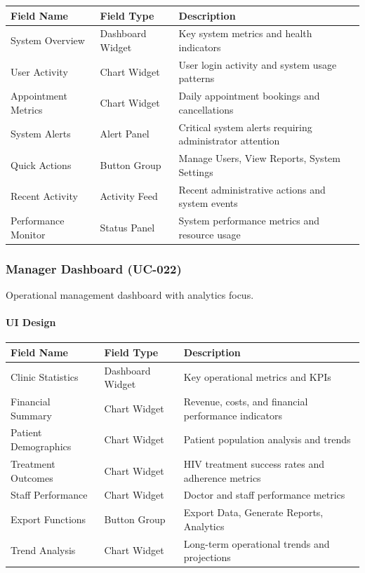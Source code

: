 \documentclass[12pt,a4paper]{article}
\begin{document}
\begin{longtable}{|p{3cm}|p{3cm}|p{8cm}|}
\hline
\textbf{Field Name} & \textbf{Field Type} & \textbf{Description} \\
\hline
System Overview & Dashboard Widget & Key system metrics and health indicators \\
\hline
User Activity & Chart Widget & User login activity and system usage patterns \\
\hline
Appointment Metrics & Chart Widget & Daily appointment bookings and cancellations \\
\hline
System Alerts & Alert Panel & Critical system alerts requiring administrator attention \\
\hline
Quick Actions & Button Group & Manage Users, View Reports, System Settings \\
\hline
Recent Activity & Activity Feed & Recent administrative actions and system events \\
\hline
Performance Monitor & Status Panel & System performance metrics and resource usage \\
\hline
\end{longtable}

\subsubsection{Manager Dashboard (UC-022)}

Operational management dashboard with analytics focus.

\paragraph{UI Design}

\begin{longtable}{|p{3cm}|p{3cm}|p{8cm}|}
\hline
\textbf{Field Name} & \textbf{Field Type} & \textbf{Description} \\
\hline
Clinic Statistics & Dashboard Widget & Key operational metrics and KPIs \\
\hline
Financial Summary & Chart Widget & Revenue, costs, and financial performance indicators \\
\hline
Patient Demographics & Chart Widget & Patient population analysis and trends \\
\hline
Treatment Outcomes & Chart Widget & HIV treatment success rates and adherence metrics \\
\hline
Staff Performance & Chart Widget & Doctor and staff performance metrics \\
\hline
Export Functions & Button Group & Export Data, Generate Reports, Analytics \\
\hline
Trend Analysis & Chart Widget & Long-term operational trends and projections \\
\hline
\end{longtable}
\end{document}
